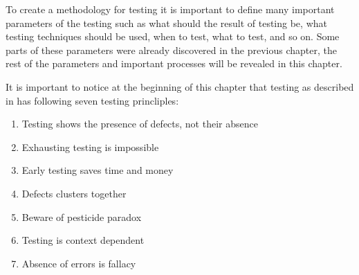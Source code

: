 


To create a methodology for testing it is important to define many important parameters of the testing such as what should the result of testing be, what testing techniques should be used, when to test, what to test, and so on. Some parts of these parameters were already discovered in the previous chapter, the rest of the parameters and important processes will be revealed in this chapter.

It is important to notice at the beginning of this chapter that testing as described in \cite{FoundationOfSoftwareTesting} has following seven testing princliples:
\begin{enumerate}
  \item Testing shows the presence of defects, not their absence
  \item Exhausting testing is impossible
  \item Early testing saves time and money
  \item Defects clusters together
  \item Beware of pesticide paradox
  \item Testing is context dependent
  \item Absence of errors is fallacy
\end{enumerate}

